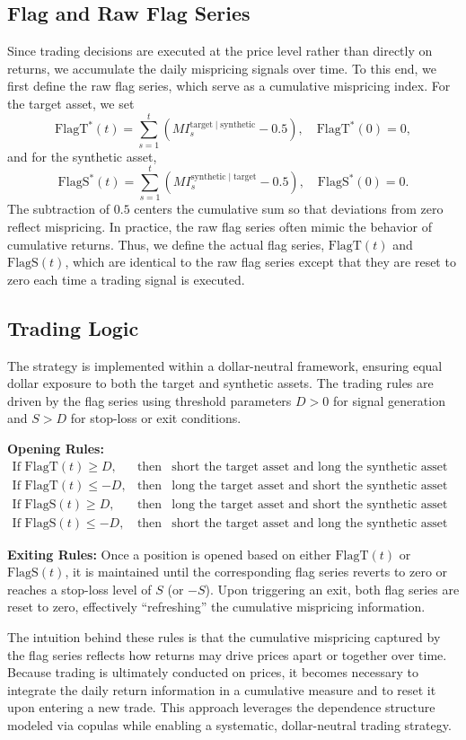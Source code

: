 \subsection{Flag and Raw Flag Series}
Since trading decisions are executed at the price level rather than directly on returns, we accumulate the daily mispricing signals over time. To this end, we first define the raw flag series, which serve as a cumulative mispricing index. For the target asset, we set
$$
\mathrm{FlagT}^*(t) = \sum_{s=1}^{t} ( MI_s^{\mathrm{target}\mid\mathrm{synthetic}} - 0.5 ), \quad \mathrm{FlagT}^*(0) = 0,
$$
and for the synthetic asset,
$$
\mathrm{FlagS}^*(t) = \sum_{s=1}^{t} ( MI_s^{\mathrm{synthetic}\mid\mathrm{target}} - 0.5 ), \quad \mathrm{FlagS}^*(0) = 0.
$$
The subtraction of $0.5$ centers the cumulative sum so that deviations from zero reflect mispricing. In practice, the raw flag series often mimic the behavior of cumulative returns. Thus, we define the actual flag series, $\mathrm{FlagT}(t)$ and $\mathrm{FlagS}(t)$, which are identical to the raw flag series except that they are reset to zero each time a trading signal is executed.

\subsection{Trading Logic}
The strategy is implemented within a dollar-neutral framework, ensuring equal dollar exposure to both the target and synthetic assets. The trading rules are driven by the flag series using threshold parameters $D>0$ for signal generation and $S>D$ for stop-loss or exit conditions.

\textbf{Opening Rules:}  
$$
\begin{array}{rcl}
\text{If } \mathrm{FlagT}(t) \geq D, & \text{then} & \text{short the target asset and long the synthetic asset in equal amounts,} \\
\text{If } \mathrm{FlagT}(t) \leq -D, & \text{then} & \text{long the target asset and short the synthetic asset in equal amounts,} \\
\text{If } \mathrm{FlagS}(t) \geq D, & \text{then} & \text{long the target asset and short the synthetic asset in equal amounts,} \\
\text{If } \mathrm{FlagS}(t) \leq -D, & \text{then} & \text{short the target asset and long the synthetic asset in equal amounts.}
\end{array}
$$

\textbf{Exiting Rules:}  
Once a position is opened based on either $\mathrm{FlagT}(t)$ or $\mathrm{FlagS}(t)$, it is maintained until the corresponding flag series reverts to zero or reaches a stop-loss level of $S$ (or $-S$). Upon triggering an exit, both flag series are reset to zero, effectively ``refreshing'' the cumulative mispricing information.

The intuition behind these rules is that the cumulative mispricing captured by the flag series reflects how returns may drive prices apart or together over time. Because trading is ultimately conducted on prices, it becomes necessary to integrate the daily return information in a cumulative measure and to reset it upon entering a new trade. This approach leverages the dependence structure modeled via copulas while enabling a systematic, dollar-neutral trading strategy.
